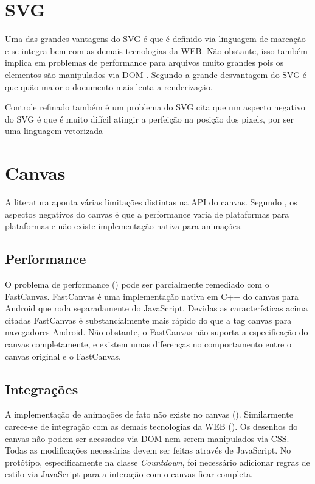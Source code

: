 \section{SVG}

Uma das grandes vantagens do SVG é que é definido via linguagem
de marcação e se integra bem com as demais tecnologias da WEB.
Não obstante, isso também implica em problemas de performance para
arquivos muito grandes pois os elementos são manipulados via DOM
. Segundo \citet{html5mostwanted} a
grande desvantagem do SVG é que quão maior o documento mais lenta a
renderização.

Controle refinado também é um problema do SVG \citet{html5mostwanted}
cita que um aspecto negativo do SVG é que é muito difícil atingir a
perfeição na posição dos pixels, por ser uma linguagem vetorizada

\section{Canvas}

A literatura aponta várias limitações distintas na API do canvas.
Segundo \autocite{html5mostwanted}, os aspectos negativos do canvas é
que a performance varia de plataformas para plataformas e não existe
implementação nativa para animações.

\subsection{Performance}

O problema de performance () pode ser parcialmente remediado
com o FastCanvas. FastCanvas é uma implementação nativa em C++ do
canvas para Android que roda separadamente do JavaScript. Devidas as
características acima citadas FastCanvas é substancialmente mais
rápido do que a tag canvas para navegadores Android. Não obstante, o
FastCanvas não suporta a especificação do canvas completamente, e
existem umas diferenças no comportamento entre o canvas original e o
FastCanvas.

\subsection{Integrações}

A implementação de animações de fato não existe no canvas
(). Similarmente carece-se de integração
com as demais tecnologias da WEB ().
Os desenhos do canvas não podem ser acessados via DOM nem serem
manipulados via CSS. Todas as modificações necessárias devem ser
feitas através de JavaScript. No protótipo, especificamente na classe
\textit{Countdown}, foi necessário adicionar regras de estilo via
JavaScript para a interação com o canvas ficar completa.

